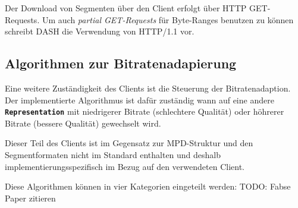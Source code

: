 \documentclass[paper = a4, fontsize = 12pt, parskip = half]{scrartcl} %
\def\elem#1{\texttt{\textbf{#1}}}
\begin{document}
Der Download von Segmenten über den Client erfolgt über HTTP GET-Requests. Um auch \textit{partial GET-Requests} für Byte-Ranges benutzen zu können schreibt DASH die Verwendung von HTTP/1.1 vor. 

\subsection{Algorithmen zur Bitratenadapierung}
Eine weitere Zuständigkeit des Clients ist die Steuerung der Bitratenadaption. Der implementierte Algorithmus ist dafür zuständig wann auf eine andere \elem{Representation} mit niedrigerer Bitrate (schlechtere Qualität) oder höhrerer Bitrate (bessere Qualität) gewechselt wird.

Dieser Teil des Clients ist im Gegensatz zur MPD-Struktur und den Segmentformaten nicht im Standard enthalten und deshalb implementierungsspezifisch im Bezug auf den verwendeten Client. 

Diese Algorithmen können in vier Kategorien eingeteilt werden:
TODO: Fabse Paper zitieren
\end{document}
